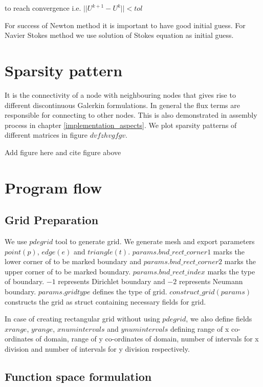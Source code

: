 \documentclass[a4paper,12pt]{book}
\begin{document}
to reach convergence i.e. $||U^{k+1} - U^k|| < tol$

For success of Newton method it is important to have good initial guess. For Navier Stokes method we use solution of Stokes equation as initial guess.

\section{Sparsity pattern}

It is the connectivity of a node with neighbouring nodes that gives rise to different discontinuous Galerkin formulations. In general the flux terms are responsible for connecting to other nodes. This is also demonstrated in assembly process in chapter \ref{implementation_aspects}. We plot sparsity patterns of different matrices in figure $dvfzhvgfgv$.

\begin{huge}
Add figure here and cite figure above
\end{huge}

\section{Program flow}

\subsection{Grid Preparation}

We use $pdegrid$ tool to generate grid. We generate mesh and export parameters $point(p)$, $edge(e)$ and $triangle(t)$. $params.bnd\_rect\_corner1$ marks the lower corner of to be marked boundary and $params.bnd\_rect\_corner2$ marks the upper corner of to be marked boundary. $params.bnd\_rect\_index$ marks the type of boundary. $-1$ represents Dirichlet boundary and $-2$ represents Neumann boundary. $params.gridtype$ defines the type of grid. $construct\_grid(params)$ constructs the grid as struct containing necessary fields for grid. 

In case of creating rectangular grid without using $pdegrid$, we also define fields $xrange$, $yrange$, $xnumintervals$ and $ynumintervals$ defining range of x co-ordinates of domain, range of y co-ordinates of domain, number of intervals for x division and number of intervals for y division respectively. 

\subsection{Function space formulation}
\end{document}
